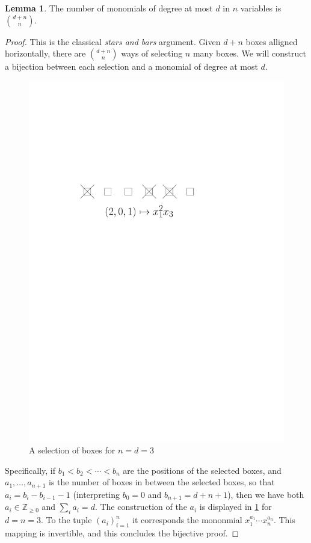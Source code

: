 \documentclass[12pt]{amsart}
\theoremstyle{definition}
\newtheorem{lm}[thm]{Lemma}
\newcommand{\Z}{\mathbb{Z}}
\begin{document}
\begin{lm}\label{lm:monomialcount}
The number of monomials of degree at most $d$ in $n$ variables is $\binom{d+n}{n}$.
\end{lm}

\begin{proof}
This is the classical \textit{stars and bars} argument.
Given $d+n$ boxes alligned horizontally, there are $\binom{d+n}{n}$ ways of selecting $n$ many boxes.
We will construct a bijection between each selection and a monomial of degree at most $d$.

\begin{figure}
\includegraphics[scale=.5]{../imgs/bars_boxes}
\caption{A selection of boxes for $n=d=3$\label{fig:starsnbars}}
\end{figure}


Specifically, if $b_1 < b_2 < \cdots < b_n$ are the positions of the selected boxes, and $a_1, \ldots, a_{n+1}$ is the number of boxes in between the selected boxes, so that $a_i = b_i - b_{i-1} - 1$ (interpreting $b_0 = 0$ and $b_{n+1} = d+n+1$), then we have both $a_i \in \Z_{\geq 0}$ and $\sum_i a_i = d$.
The construction of the $a_i$ is displayed in \cref{fig:starsnbars} for $d = n = 3$.
To the tuple $(a_i)_{i=1}^n$ it corresponds the mononmial $x_1^{a_1}\cdots x_n^{a_n}$.
This mapping is invertible, and this concludes the bijective proof.
\end{proof}
\end{document}
